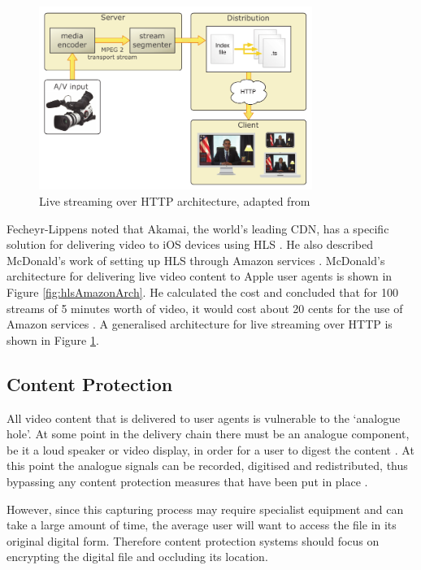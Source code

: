 \documentclass[journal]{IEEEtran}
\begin{document}
\begin{figure}[!t]
\centering
\includegraphics[width=3.5in]{streaming-architecture}
\caption{Live streaming over HTTP architecture, adapted from  \cite{techreport:aReviewOfHTTPLiveStreaming}}
\label{fig:HTTPLiveStreamingArch}
\end{figure}

Fecheyr-Lippens noted that Akamai, the world's leading CDN, has a specific solution for delivering video to iOS devices using HLS \cite{whitePaper:akamaiHDNetwork}\cite{techreport:aReviewOfHTTPLiveStreaming}. He also described McDonald's work of setting up HLS through Amazon services \cite{website:iPhoneHLSAmazon}. McDonald's architecture for delivering live video content to Apple user agents is shown in Figure \ref{fig:hlsAmazonArch}. He calculated the cost and concluded that for 100 streams of 5 minutes worth of video, it would cost about 20 cents for the use of Amazon services \cite{website:iPhoneHLSAmazon}. A generalised architecture for live streaming over HTTP is shown in Figure \ref{fig:HTTPLiveStreamingArch}.

\subsection{Content Protection}
All video content that is delivered to user agents is vulnerable to the `analogue hole'. At some point in the delivery chain there must be an analogue component, be it a loud speaker or video display, in order for a user to digest the content \cite{inproceedings:closingTheAnalogueHole}. At this point the analogue signals can be recorded, digitised and redistributed, thus bypassing any content protection measures that have been put in place \cite{inproceedings:closingTheAnalogueHole}.

However, since this capturing process may require specialist equipment and can take a large amount of time, the average user will want to access the file in its original digital form. Therefore content protection systems should focus on encrypting the digital file and occluding its location.
\end{document}
